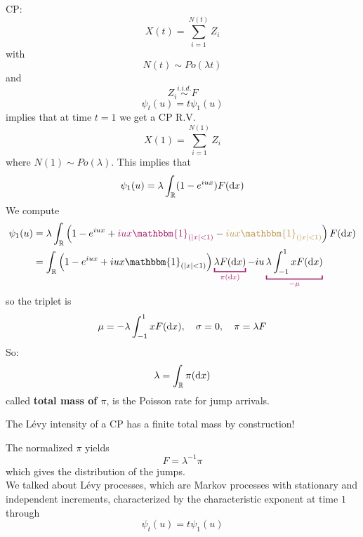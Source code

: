 \documentclass[class=article,crop=false]{standalone}
\begin{document}
\begin{example}
	CP:
	\begin{equation*}
		X(t) = \sum_{i=1}^{N(t)} Z_i
	\end{equation*}
	with 
	\begin{equation*}
		N(t) \sim Po(\lambda t)
	\end{equation*}
	and 
	\begin{equation*}
		Z_i \stackrel{i.i.d.} \sim F
	\end{equation*}
	\begin{equation*}
		\psi_t(u) = t \psi_1(u)  
	\end{equation*}
	implies that at time $t=1$ we get a CP R.V.
	\begin{equation*}
		X(1) = \sum_{i=1}^{N(1)} Z_i
	\end{equation*}
	where $N(1) \sim Po(\lambda)$.
	This implies that 
	\begin{equation*}
		\psi_1(u) = \lambda \int_{\mathbb{R}} (1-e^{iux}) F(\mathop{}\!\mathrm{d} x)
	\end{equation*}
	We compute 
	\begin{align*}
		\psi_1(u) &= \lambda \int_\mR \left(1-e^{iux} + \textcolor{RedViolet}{iux \mathbbm{1}_{(|x| < 1)}} - \textcolor{Dandelion!70!black}{iux \mathbbm{1}_{(|x| < 1)}}\right)F(\dif x) \\
		&= \int_\mR \left(1-e^{iux} + iux\mathbbm{1}_{(|x| < 1)}\right)\color{RedViolet}\underbracket{\color{black}\lambda F(\dif x)}_{\color{RedViolet}\pi(\dif x)}\color{black} - iu\color{RedViolet}\underbracket{\color{black} \lambda \int_{-1}^1 x F(\dif x)}_{\color{RedViolet} -\mu}
	\end{align*}
	so the triplet is 
	\begin{equation*}
		\mu= -\lambda \int_{-1}^1 x F(\mathop{}\!\mathrm{d} x), \quad \sigma = 0, \quad \pi = \lambda F
	\end{equation*}
	So:
	\begin{equation*}
		\lambda = \int_{\mathbb{R}} \pi(\mathop{}\!\mathrm{d} x)
	\end{equation*}
	called \textbf{total mass of $\pi$}, is the Poisson rate for jump arrivals. \\
\end{example}
\begin{remark}
	The L\'evy intensity of a CP has a finite total mass by construction!
\end{remark}
The normalized $\pi$ yields 
\begin{equation*}
	F = \lambda^{-1} \pi
\end{equation*}
which gives the distribution of the jumps. \\

We talked about 
L\'evy processes, which are Markov processes with stationary and independent increments, characterized by the characteristic exponent at time $1$ through 
\begin{equation*}
	\psi_t(u) = t \psi_1(u)
\end{equation*}
\end{document}
